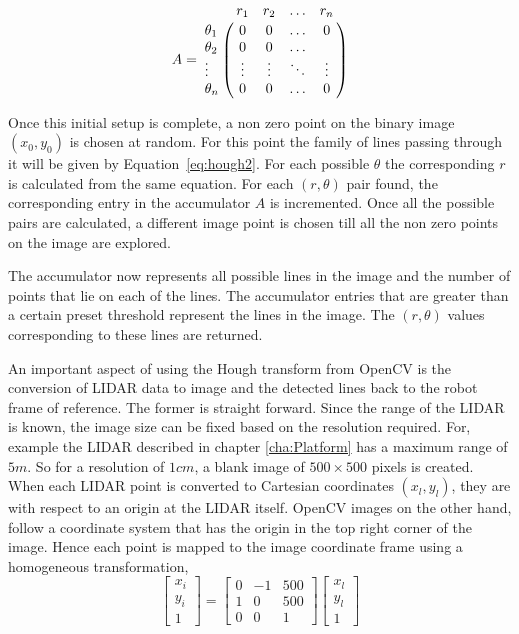 \begin{equation}
A=\bordermatrix{~  & r_1 & r_2&\ldots & r_n \cr
              \theta_1& 0 &  0  & \ldots & 0\cr
              \theta_2& 0  &  0 & \ldots & \cr
              \vdots& \vdots & \vdots & \ddots & \vdots\cr
              \theta_n& 0  &   0       &\ldots & 0}
\label{eq:hough3}
\end{equation} 

 Once this initial setup is complete, a non zero point on the binary image $ (x_0,y_0) $ is chosen at random. For this point the family of lines passing through it will be given by Equation~\ref{eq:hough2}. For each possible $ \theta $ the corresponding $ r $ is calculated from the same equation. For each $ (r,\theta) $ pair found, the corresponding entry in the accumulator $ A $ is incremented. Once all the possible pairs are calculated, a different image point is chosen till all the non zero points on the image are explored. 
 
 The accumulator now represents all possible lines in the image and the number of points that lie on each of the lines. The accumulator entries that are greater than a certain preset threshold represent the lines in the image. The $ (r,\theta) $ values corresponding to these lines are returned. 
 
 An important aspect of using the Hough transform from OpenCV is the conversion of LIDAR data to image and the detected lines back to the robot frame of reference. The former is straight forward. Since the range of the LIDAR is known, the image size can be fixed based on the resolution required. For, example the LIDAR described in chapter \ref{cha:Platform} has a maximum range of $ 5 m $. So for a resolution of $ 1 cm $, a blank image of $ 500 \times 500 $ pixels is created. When each LIDAR point is converted to Cartesian coordinates $ (x_l,y_l) $, they are with respect to an origin at the LIDAR itself. OpenCV images on the other hand, follow a coordinate system that has the origin in the top right corner of the image. Hence each point is mapped to the image coordinate frame using a homogeneous transformation,
 \begin{equation}
 \begin{bmatrix}
 x_i\\y_i\\1
 \end{bmatrix}=
 \begin{bmatrix}
 0 & -1 & 500\\
 1 & 0 & 500\\
 0 & 0 & 1
 \end{bmatrix}
 \begin{bmatrix}
 x_l\\y_l\\1
 \end{bmatrix}
 \label{eq:hough4}
 \end{equation}
 

